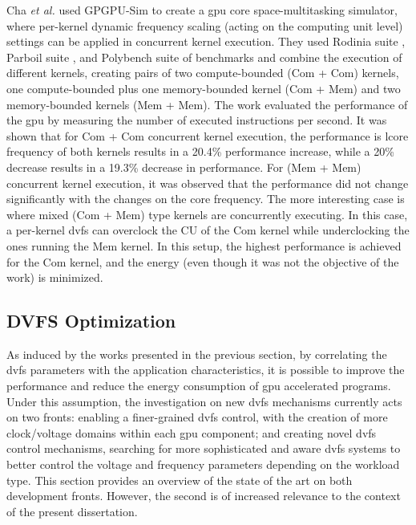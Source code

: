 Cha \textit{et al.} \cite{cha_core-level_2018} used GPGPU-Sim to create a \acrshort{gpu} core space-multitasking simulator, where per-kernel dynamic frequency scaling (acting on the computing unit level) settings can be applied in concurrent kernel execution. They used Rodinia suite \cite{che_rodinia:_2009}, Parboil suite \cite{stratton_parboil:_nodate}, and Polybench suite \cite{noauthor_polybench/c_nodate} of benchmarks and combine the execution of different kernels, creating pairs of two compute-bounded (Com + Com) kernels, one compute-bounded plus one memory-bounded kernel (Com + Mem) and two memory-bounded kernels (Mem + Mem). The work evaluated the performance of the \acrshort{gpu} by measuring the number of executed instructions per second. It was shown that for Com + Com concurrent kernel execution, the performance is lcore frequency of both kernels results in a 20.4\% performance increase, while a 20\% decrease results in a 19.3\% decrease in performance. For (Mem + Mem) concurrent kernel execution, it was observed that the performance did not change significantly with the changes on the core frequency. The more interesting case is where mixed (Com + Mem) type kernels are concurrently executing. In this case, a per-kernel \acrshort{dvfs} can overclock the CU of the Com kernel while underclocking the ones running the Mem kernel. In this setup, the highest performance is achieved for the Com kernel, and the energy (even though it was not the objective of the work) is minimized.

\subsection{DVFS Optimization}
\label{section:DVFS_opt}

As induced by the works presented in the previous section, by correlating the \acrshort{dvfs} parameters with the application characteristics, it is possible to improve the performance and reduce the energy consumption of \acrshort{gpu} accelerated programs. Under this assumption, the investigation on new \acrshort{dvfs} mechanisms currently acts on two fronts: enabling a finer-grained \acrshort{dvfs} control, with the creation of more clock/voltage domains within each \acrshort{gpu} component; and creating novel \acrshort{dvfs} control mechanisms, searching for more sophisticated and aware \acrshort{dvfs} systems to better control the voltage and frequency parameters depending on the workload type. This section provides an overview of the state of the art on both development fronts. However, the second is of increased relevance to the context of the present dissertation.


